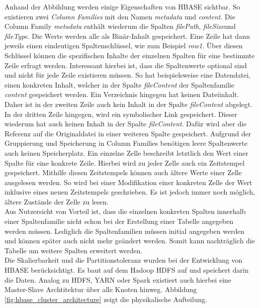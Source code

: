 \noindent
Anhand der Abbildung werden einige Eigenschaften von HBASE sichtbar. So existieren zwei \textit{Column Families} mit den Namen \textit{metadata} und \textit{content}. Die Column Family \textit{metadata} enthält wiederum die Spalten \textit{filePath}, \textit{fileSize}und \textit{fileType}. Die Werte werden alle als Binär-Inhalt gespeichert. Eine Zeile hat dann jeweils einen eindeutigen Spaltenschlüssel, wie zum Beispiel \textit{row1}. 
Über diesen Schlüssel können die spezifischen Inhalte der einzelnen Spalten für eine bestimmte Zeile erfragt werden. Interessant hierbei ist, dass die Spaltenwerte optional sind und nicht für jede Zeile existieren müssen. So hat beispielsweise eine Datendatei, einen konkreten Inhalt, welcher in der Spalte \textit{fileContent} der Spaltenfamilie \textit{content} gespeichert werden. Ein Verzeichnis hingegen hat keinen Dateiinhalt. Daher ist in der zweiten Zeile auch kein Inhalt in der Spalte \textit{fileContent} abgelegt. In der dritten Zeile hingegen, wird ein symbolischer Link gespeichert. Dieser wiederum hat auch keinen Inhalt in der Spalte \textit{fileContent}. Dafür wird aber die Referenz auf die Originaldatei in einer weiteren Spalte gespeichert. Aufgrund der Gruppierung und Speicherung in Column Families benötigen leere Spaltenwerte auch keinen Speicherplatz. 
Ein einzelne Zelle beschreibt letztlich den Wert einer Spalte für eine konkrete Zeile. Hierbei wird zu jeder Zelle auch ein Zeitstempel gespeichert. Mithilfe diesen Zeitstempels können auch ältere Werte einer Zelle ausgelesen werden. 
So wird bei einer Modifikation einer konkreten Zelle der Wert inklusive eines neuen Zeitstempels geschrieben. Es ist jedoch immer noch möglich, ältere Zustände der Zelle zu lesen.\\
Aus Nutzersicht von Vorteil ist, dass die einzelnen konkreten Spalten innerhalb einer Spaltenfamilie nicht schon bei der Erstellung einer Tabelle angegeben werden müssen. Lediglich die Spaltenfamilien müssen initial angegeben werden und können später auch nicht mehr geändert werden. Somit kann nachträglich die Tabelle um weitere Spalten erweitert werden.\\

\noindent
Die Skalierbarkeit und die Partitionstoleranz wurden bei der Entwicklung von HBASE berücksichtigt. Es baut auf dem Hadoop HDFS auf und speichert darin die Daten. Analog zu HDFS, YARN oder Spark existiert auch hierbei eine Master-Slave Archtitektur über alle Knoten hinweg. Abbildung \ref{fig:hbase_cluster_architecture} zeigt die physikalische Aufteilung.\\

